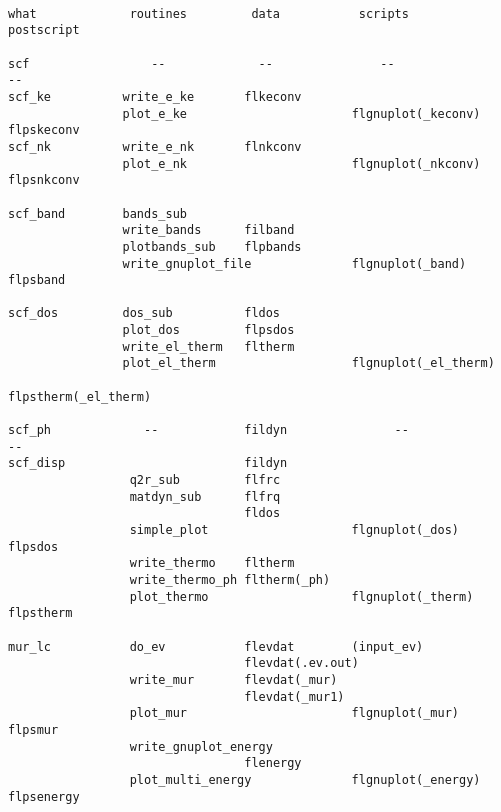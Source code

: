 \documentclass[12pt,a4paper]{article}
\begin{document}
\begin{verbatim}

what             routines         data           scripts            postscript

scf                 --             --               --                 --
scf_ke          write_e_ke       flkeconv
                plot_e_ke                       flgnuplot(_keconv)  flpskeconv
scf_nk          write_e_nk       flnkconv
                plot_e_nk                       flgnuplot(_nkconv)  flpsnkconv

scf_band        bands_sub
                write_bands      filband
                plotbands_sub    flpbands
                write_gnuplot_file              flgnuplot(_band)    flpsband     

scf_dos         dos_sub          fldos
                plot_dos         flpsdos
                write_el_therm   fltherm
                plot_el_therm                   flgnuplot(_el_therm) 
                                                           flpstherm(_el_therm)

scf_ph             --            fildyn               --                  --
scf_disp                         fildyn
                 q2r_sub         flfrc
                 matdyn_sub      flfrq
                                 fldos
                 simple_plot                    flgnuplot(_dos)     flpsdos
                 write_thermo    fltherm
                 write_thermo_ph fltherm(_ph)
                 plot_thermo                    flgnuplot(_therm)   flpstherm

mur_lc           do_ev           flevdat        (input_ev)
                                 flevdat(.ev.out)
                 write_mur       flevdat(_mur)
                                 flevdat(_mur1)
                 plot_mur                       flgnuplot(_mur)     flpsmur
                 write_gnuplot_energy
                                 flenergy
                 plot_multi_energy              flgnuplot(_energy)  flpsenergy


\end{verbatim}
\end{document}
